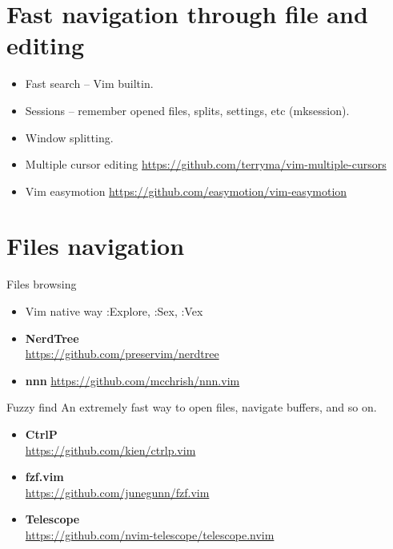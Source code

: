 \documentclass[aspectratio=169]{beamer}
\begin{document}
\section*{Fast navigation through file and editing}
\begin{frame}{\secname}
  \begin{itemize}
    \item Fast search -- Vim builtin. 
    \item Sessions -- remember opened files, splits, settings, etc (mksession).
    \item Window splitting. 
    \item Multiple cursor editing \url{https://github.com/terryma/vim-multiple-cursors}
    \item Vim easymotion \url{https://github.com/easymotion/vim-easymotion}
  \end{itemize}
  	
\end{frame}

\section*{Files navigation}
\begin{frame}{\secname}

  \begin{block}{Files browsing}
    \begin{itemize}
      \item {Vim native way :Explore, :Sex, :Vex}
      \item {\bf NerdTree}\\ \url{https://github.com/preservim/nerdtree}
      \item \textbf{nnn} \url{https://github.com/mcchrish/nnn.vim}
    \end{itemize}
  \end{block}

  \begin{block}{Fuzzy find }
    An extremely fast way to open files, navigate buffers, and so on.
    \begin{itemize}
      \item {\bf CtrlP}\\ \url{https://github.com/kien/ctrlp.vim} 
      \item {\bf fzf.vim}\\ \url{https://github.com/junegunn/fzf.vim} 
      \item {\bf Telescope}\\ \url{https://github.com/nvim-telescope/telescope.nvim} 
    \end{itemize}
  \end{block}
    
\end{frame}
\end{document}
